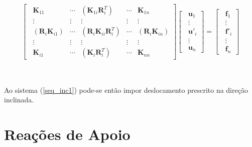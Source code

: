 \begin{align}   \label{seq_inc1}
	\left[\;\; \begin{matrix}
			\mathbf{K}_{11}                      & \cdots & \left( \mathbf{K}_{1i}\mathbf{R}_i^T \right)         & \cdots & \mathbf{K}_{1n}                      \\
			\vdots                           & \vdots & \vdots                                       & \vdots & \vdots                           \\
			\left(\mathbf{R}_i\mathbf{K}_{i1}\right) & \cdots & \left( \mathbf{R}_i\mathbf{K}_{ii}\mathbf{R}_i^T \right) & \cdots & \left(\mathbf{R}_i\mathbf{K}_{in}\right) \\
			\vdots                           & \vdots & \vdots                                       & \vdots & \vdots                           \\
			\mathbf{K}_{i1}                      & \cdots & \left( \mathbf{K}_{i}\mathbf{R}_i^T \right)          & \cdots & \mathbf{K}_{nn}
		\end{matrix} \right]
	\left[\;\; \begin{matrix}
			\mathbf{u}_1    \\
			\vdots      \\
			{\mathbf{u'}}_i \\
			\vdots      \\
			\mathbf{u}_n
		\end{matrix} \right]=
	\left[\;\; \begin{matrix}
			\mathbf{f}_1  \\
			\vdots    \\
			\mathbf{f}'_i \\
			\vdots    \\
			\mathbf{f}_n
		\end{matrix} \right]\end{align}

\

Ao sistema (\ref{seq_inc1}) pode-se então impor deslocamento prescrito na direção inclinada.

\section{Reações de Apoio}

